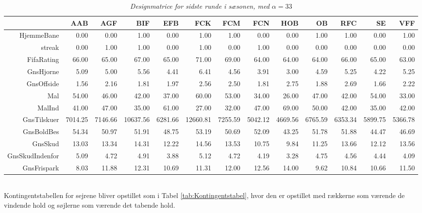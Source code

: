 \documentclass[11pt,a4paper]{article}
\begin{document}
\begin{table}[ht]
\centering
\begin{adjustbox}{max width=\textwidth}
\begin{tabular}{|r|rrrrrrrrrrrr|}
  \hline
 & AAB & AGF & BIF & EFB & FCK & FCM & FCN & HOB & OB & RFC & SE & VFF \\ 
  \hline
HjemmeBane & 0.00 & 0.00 & 1.00 & 0.00 & 1.00 & 1.00 & 0.00 & 0.00 & 1.00 & 1.00 & 0.00 & 1.00 \\ 
  streak & 0.00 & 1.00 & 1.00 & 0.00 & 1.00 & 0.00 & 1.00 & 0.00 & 0.00 & 0.00 & 0.00 & 0.00 \\ 
  FifaRating & 66.00 & 65.00 & 67.00 & 65.00 & 71.00 & 69.00 & 64.00 & 64.00 & 64.00 & 66.00 & 65.00 & 63.00 \\ 
  GnsHjorne & 5.09 & 5.00 & 5.56 & 4.41 & 6.41 & 4.56 & 3.91 & 3.00 & 4.59 & 5.25 & 4.22 & 5.25 \\ 
  GnsOffside & 1.56 & 2.16 & 1.81 & 1.97 & 2.56 & 2.50 & 1.81 & 2.75 & 1.88 & 2.69 & 1.66 & 2.22 \\ 
  Mal & 54.00 & 46.00 & 42.00 & 37.00 & 60.00 & 53.00 & 34.00 & 26.00 & 47.00 & 42.00 & 54.00 & 33.00 \\ 
  MalInd & 41.00 & 47.00 & 35.00 & 61.00 & 27.00 & 32.00 & 47.00 & 69.00 & 50.00 & 42.00 & 35.00 & 42.00 \\ 
  GnsTilskuer & 7014.25 & 7146.66 & 10637.56 & 6281.66 & 12660.81 & 7255.59 & 5042.12 & 4669.56 & 6765.59 & 6353.34 & 5899.75 & 5366.78 \\ 
  GnsBoldBes & 54.34 & 50.97 & 51.91 & 48.75 & 53.19 & 50.69 & 52.09 & 43.25 & 51.78 & 51.88 & 44.47 & 46.69 \\ 
  GnsSkud & 13.03 & 13.34 & 14.31 & 12.22 & 14.56 & 13.53 & 10.75 & 9.84 & 11.25 & 13.66 & 12.12 & 13.56 \\ 
  GnsSkudIndenfor & 5.09 & 4.72 & 4.91 & 3.88 & 5.12 & 4.72 & 4.19 & 3.28 & 4.75 & 4.56 & 4.44 & 4.09 \\ 
  GnsFrispark & 8.03 & 11.88 & 12.31 & 10.69 & 11.31 & 12.00 & 12.56 & 14.00 & 9.62 & 10.84 & 10.66 & 11.50 \\ 
   \hline
\end{tabular}
\end{adjustbox}
\caption{\label{tab:Designmatrice}\textit{Designmatrice for sidste runde i sæsonen, med $\alpha = 33$}}
\end{table}
\\Kontingentstabellen for sejrene bliver opstillet som i Tabel \ref{tab:Kontingentstabel}, hvor den er opstillet med rækkerne som værende de vindende hold og søjlerne som værende det tabende hold.
\end{document}
